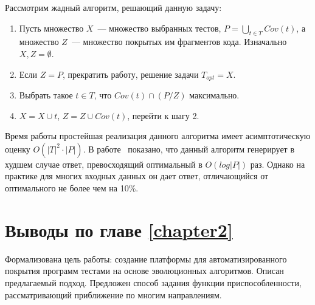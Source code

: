 Рассмотрим жадный алгоритм, решающий данную задачу:
\begin{enumerate}
 \item Пусть множество $X$~--- множество выбранных тестов, $P = \bigcup\limits_{t \in T}Cov(t)$, а множество $Z$~--- множество покрытых им фрагментов кода. 
Изначально $X, Z = \emptyset$.
 \item Если $Z = P$, прекратить работу, решение задачи $T_{opt} = X$.
 \item Выбрать такое $t \in T$, что $Cov(t) \cap (P / Z)$ максимально.
 \item $X = X \cup {t}$, $Z = Z \cup Cov(t)$, перейти к шагу 2.
\end{enumerate}

Время работы простейшая реализация данного алгоритма имеет асимптотическую оценку $O(|T|^2 \cdot |P|)$.  В работе~\cite{minimization_characterization} 
показано, что данный алгоритм генерирует в худшем случае ответ, превосходящий оптимальный в $O(log|P|)$ раз. Однако на практике для многих входных данных он 
дает ответ, отличающийся от оптимального не более чем на 10\%.

\section{Выводы по главе \ref{chapter2}}
Формализована цель работы: создание платформы для автоматизированного покрытия программ тестами на основе эволюционных алгоритмов. Описан предлагаемый подход. 
Предложен способ задания функции приспособленности, рассматривающий приближение по многим направлениям.